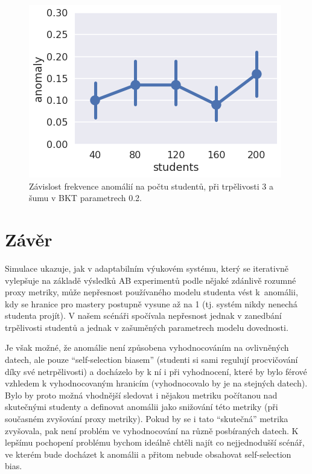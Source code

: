 \documentclass[twocolumn,10pt,cleanfoot]{asme2ej}
\begin{document}
\begin{figure}[htb]
\centering
\includegraphics[width=\columnwidth]{img/anomaly-students}
\caption{%
  Závislost frekvence anomálií na počtu studentů,
  při trpělivosti 3 a šumu v BKT parametrech 0.2.}
\label{fig:anomaly-students}
\end{figure}


\section{Závěr}

Simulace ukazuje, jak v adaptabilním výukovém systému, který se iterativně vylepšuje na základě výsledků AB experimentů podle nějaké zdánlivě rozumné proxy metriky, může nepřesnost používaného modelu studenta vést k~anomálii, kdy se hranice pro mastery postupně vysune až na 1 (tj. systém nikdy nenechá studenta projít). V našem scénáři spočívala nepřesnost jednak v zanedbání trpělivosti studentů a jednak v zašuměných parametrech modelu dovednosti.

Je však možné, že anomálie není způsobena vyhodnocováním na ovlivněných datech, ale pouze “self-selection biasem” (studenti si sami regulují procvičování díky své netrpělivosti) a docházelo by k ní i při vyhodnocení, které by bylo férové vzhledem k vyhodnocovaným hranicím (vyhodnocovalo by je na stejných datech). Bylo by proto možná vhodnější sledovat i nějakou metriku počítanou nad skutečnými studenty a definovat anomálii jako snižování této metriky (při současném zvyšování proxy metriky). Pokud by se i tato “skutečná” metrika zvyšovala, pak není problém ve vyhodnocování na různě posbíraných datech. K lepšímu pochopení problému bychom ideálně chtěli najít co nejjednodušší scénář, ve kterém bude docházet k anomálii a přitom nebude obsahovat self-selection bias.
\end{document}
